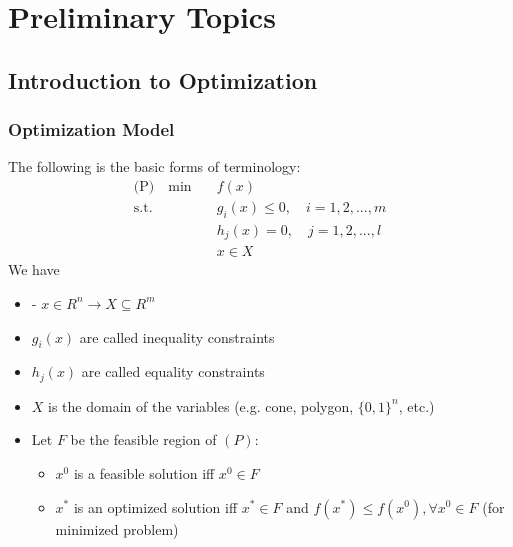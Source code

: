

\part{Preliminary Topics}
	\chapter{Introduction to Optimization}
		\section{Optimization Model}
			The following is the basic forms of terminology:
				\begin{align}
					\text{(P)} \quad \text{min} \quad & f(x)  \\
								\text{s.t.} \quad & g_i(x)\le 0, \quad i=1,2,...,m \\
											& h_j(x)=0, \quad j=1,2,...,l \\
											& x \in X 
				\end{align}
				We have
				\begin{itemize}
					\item - $x\in R^n \rightarrow X \subseteq R^m$
					\item $g_i(x)$ are called inequality constraints
					\item $h_j(x)$ are called equality constraints
					\item $X$ is the domain of the variables (e.g. cone, polygon, $\{0, 1\}^n$, etc.)
					\item Let $F$ be the feasible region of $(P)$:
					\begin{itemize}
						\item $x^0$ is a feasible solution iff $x^0\in F$
						\item $x^*$ is an optimized solution iff $x^* \in F$ and $f(x^*)\le f(x^0), \forall x^0 \in F$ (for minimized problem)
					\end{itemize}
				\end{itemize}


